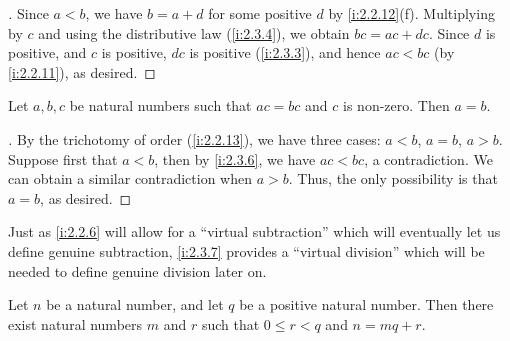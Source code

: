 \begin{proof}[]
  Since \(a < b\), we have \(b = a + d\) for some positive \(d\) by \cref{i:2.2.12}(f).
  Multiplying by \(c\) and using the distributive law (\cref{i:2.3.4}), we obtain \(bc = ac + dc\).
  Since \(d\) is positive, and \(c\) is positive, \(dc\) is positive (\cref{i:2.3.3}), and hence \(ac < bc\) (by \cref{i:2.2.11}), as desired.
\end{proof}

\begin{cor}\label{i:2.3.7}
  Let \(a, b, c\) be natural numbers such that \(ac = bc\) and \(c\) is non-zero.
  Then \(a = b\).
\end{cor}

\begin{proof}[]
  By the trichotomy of order (\cref{i:2.2.13}), we have three cases: \(a < b\), \(a = b\), \(a > b\).
  Suppose first that \(a < b\), then by \cref{i:2.3.6}, we have \(ac < bc\), a contradiction.
  We can obtain a similar contradiction when \(a > b\).
  Thus, the only possibility is that \(a = b\), as desired.
\end{proof}

\begin{rmk}\label{i:2.3.8}
  Just as \cref{i:2.2.6} will allow for a ``virtual subtraction'' which will eventually let us define genuine subtraction, \cref{i:2.3.7} provides a ``virtual division'' which will be needed to define genuine division later on.
\end{rmk}

\begin{prop}\label{i:2.3.9}
  Let \(n\) be a natural number, and let \(q\) be a positive natural number.
  Then there exist natural numbers \(m\) and \(r\) such that \(0 \leq r < q\) and \(n = mq + r\).
\end{prop}

